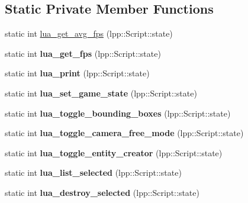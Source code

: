 \subsection*{Static Private Member Functions}
\begin{DoxyCompactItemize}
\item 
static int \hyperlink{class_lua_interface_aac8cc7f5beeb8ffe8d637abc7a1d3600}{lua\+\_\+get\+\_\+avg\+\_\+fps} (lpp\+::\+Script\+::state)
\item 
static int {\bfseries lua\+\_\+get\+\_\+fps} (lpp\+::\+Script\+::state)\hypertarget{class_lua_interface_a29f3c1ffa0a902adac4e67d3385d5af4}{}\label{class_lua_interface_a29f3c1ffa0a902adac4e67d3385d5af4}

\item 
static int {\bfseries lua\+\_\+print} (lpp\+::\+Script\+::state)\hypertarget{class_lua_interface_a51e679ea9a576d2aeefedd1c959f45d7}{}\label{class_lua_interface_a51e679ea9a576d2aeefedd1c959f45d7}

\item 
static int {\bfseries lua\+\_\+set\+\_\+game\+\_\+state} (lpp\+::\+Script\+::state)\hypertarget{class_lua_interface_a5aa5fff6b89dd6be1beac175957eb80d}{}\label{class_lua_interface_a5aa5fff6b89dd6be1beac175957eb80d}

\item 
static int {\bfseries lua\+\_\+toggle\+\_\+bounding\+\_\+boxes} (lpp\+::\+Script\+::state)\hypertarget{class_lua_interface_ac37363a7902485c77456c3272c3d812d}{}\label{class_lua_interface_ac37363a7902485c77456c3272c3d812d}

\item 
static int {\bfseries lua\+\_\+toggle\+\_\+camera\+\_\+free\+\_\+mode} (lpp\+::\+Script\+::state)\hypertarget{class_lua_interface_af4efc25e6844f768fa5b0334c8f54d40}{}\label{class_lua_interface_af4efc25e6844f768fa5b0334c8f54d40}

\item 
static int {\bfseries lua\+\_\+toggle\+\_\+entity\+\_\+creator} (lpp\+::\+Script\+::state)\hypertarget{class_lua_interface_ab9590bfdd7bdd79dc84295ce4c1e4bd9}{}\label{class_lua_interface_ab9590bfdd7bdd79dc84295ce4c1e4bd9}

\item 
static int {\bfseries lua\+\_\+list\+\_\+selected} (lpp\+::\+Script\+::state)\hypertarget{class_lua_interface_a27826f52870ace0f8a7fb2e94815ed14}{}\label{class_lua_interface_a27826f52870ace0f8a7fb2e94815ed14}

\item 
static int {\bfseries lua\+\_\+destroy\+\_\+selected} (lpp\+::\+Script\+::state)\hypertarget{class_lua_interface_ae67e86128e80404fa6a4876db465ae75}{}\label{class_lua_interface_ae67e86128e80404fa6a4876db465ae75}


\end{DoxyCompactItemize}
